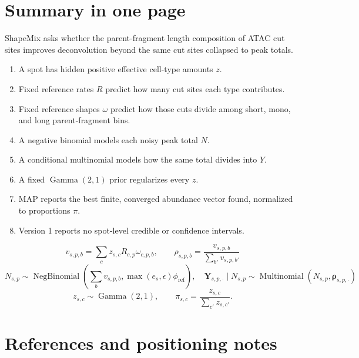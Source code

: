 \documentclass[11pt]{article}
\newcommand{\NB}{\operatorname{NegBinomial}}
\newcommand{\Mult}{\operatorname{Multinomial}}
\newcommand{\Gam}{\operatorname{Gamma}}
\begin{document}
\clearpage
\section{Summary in one page}

\begin{bigidea}
ShapeMix asks whether the parent-fragment length composition of ATAC cut sites
improves deconvolution beyond the same cut sites collapsed to peak totals.
\end{bigidea}

\begin{enumerate}[leftmargin=2em]
  \item A spot has hidden positive effective cell-type amounts \(z\).
  \item Fixed reference rates \(R\) predict how many cut sites each type contributes.
  \item Fixed reference shapes \(\omega\) predict how those cuts divide among
  short, mono, and long parent-fragment bins.
  \item A negative binomial models each noisy peak total \(N\).
  \item A conditional multinomial models how the same total divides into \(Y\).
  \item A fixed \(\Gam(2,1)\) prior regularizes every \(z\).
  \item MAP reports the best finite, converged abundance vector found, normalized
  to proportions \(\pi\).
  \item Version 1 reports no spot-level credible or confidence intervals.
\end{enumerate}

\[
\boxed{
v_{s,p,b}=\sum_cz_{s,c}R_{c,p}\omega_{c,p,b},
\qquad
\rho_{s,p,b}=\frac{v_{s,p,b}}{\sum_{b'}v_{s,p,b'}}
}
\]
\[
\boxed{
N_{s,p}\sim\NB\!\left(
\sum_bv_{s,p,b},
\max(e_s,\epsilon)\phi_{\mathrm{ref}}
\right),
\quad
\boldsymbol Y_{s,p,\cdot}\mid N_{s,p}
\sim\Mult(N_{s,p},\boldsymbol\rho_{s,p,\cdot})
}
\]
\[
\boxed{
z_{s,c}\sim\Gam(2,1),
\qquad
\pi_{s,c}=\frac{z_{s,c}}{\sum_{c'}z_{s,c'}}.
}
\]

\section*{References and positioning notes}
\end{document}
